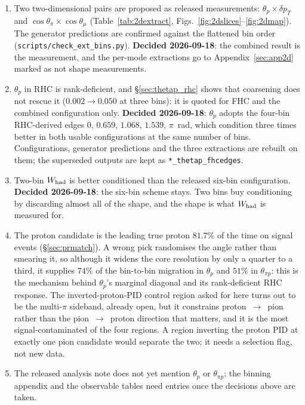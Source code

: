 \begin{enumerate}[itemsep=3pt]
  \item Two two-dimensional pairs are proposed as released measurements: $\theta_p\times\delta p_T$
    and $\cos\theta_\pi\times\cos\theta_\mu$ (Table~\ref{tab:2dextract},
    Figs.~\ref{fig:2dslices}--\ref{fig:2dmap}). The generator predictions are confirmed against the
    flattened bin order (\texttt{scripts/check\_ext\_bins.py}). \textbf{Decided 2026-09-18}: the
    combined result is the measurement, and the per-mode extractions go to
    Appendix~\ref{sec:app2d} marked as not shape measurements.
  \item $\theta_p$ in RHC is rank-deficient, and \S\ref{sec:thetap_rhc} shows that coarsening does
    not rescue it ($0.002\to0.050$ at three bins): it is quoted for FHC and the combined
    configuration only. \textbf{Decided 2026-09-18}: $\theta_p$ adopts the four-bin RHC-derived
    edges $0$, $0.659$, $1.068$, $1.539$, $\pi$~rad, which condition three times better in both
    usable configurations at the same number of bins. Configurations, generator predictions and the
    three extractions are rebuilt on them; the superseded outputs are kept as
    \texttt{*\_thetap\_fhcedges}.
  \item Two-bin $W_{\rm had}$ is better conditioned than the released six-bin configuration.
    \textbf{Decided 2026-09-18}: the six-bin scheme stays. Two bins buy conditioning by discarding
    almost all of the shape, and the shape is what $W_{\rm had}$ is measured for.
  \item The proton candidate is the leading true proton $81.7\%$ of the time on signal events
    (\S\ref{sec:prmatch}). A wrong pick randomises the angle rather than smearing it, so although it
    widens the core resolution by only a quarter to a third, it supplies $74\%$ of the
    bin-to-bin migration in $\theta_p$ and $51\%$ in $\theta_{\pi p}$: this is the mechanism behind
    $\theta_p$'s marginal diagonal and its rank-deficient RHC response. The inverted-proton-PID
    control region asked for here turns out to be the multi-$\pi$ sideband, already open, but it
    constrains proton~$\to$~pion rather than the pion~$\to$~proton direction that matters, and it is
    the most signal-contaminated of the four regions. A region inverting the proton PID at exactly
    one pion candidate would separate the two; it needs a selection flag, not new data.
  \item The released analysis note does not yet mention $\theta_p$ or $\theta_{\pi p}$; the binning
    appendix and the observable tables need entries once the decisions above are taken.
\end{enumerate}


